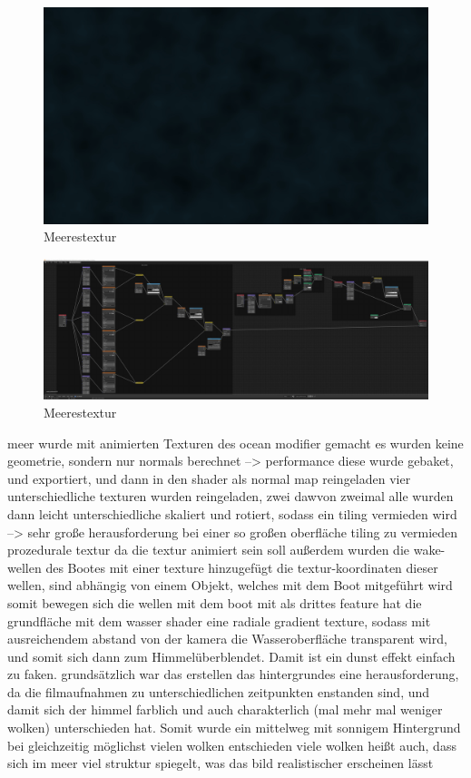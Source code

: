 \begin{figure}[H]
\includegraphics[width=\textwidth]{gfx/prod/ocean/meer7.jpg}
\caption{Meerestextur}
\label{meer7}
\end{figure}

\begin{figure}[H]
\includegraphics[width=\textwidth]{gfx/prod/env/ocean_shader.jpg}
\caption{Meerestextur}
\label{ocean_shader}
\end{figure}


meer wurde mit animierten Texturen des ocean modifier gemacht
es wurden keine geometrie, sondern nur normals berechnet --> performance
diese wurde gebaket, und exportiert, und dann in den shader als normal map reingeladen
vier unterschiedliche texturen wurden reingeladen, zwei dawvon zweimal
alle wurden dann leicht unterschiedliche skaliert und rotiert, sodass ein tiling vermieden wird
--> sehr große herausforderung bei einer so großen oberfläche tiling zu vermieden
prozedurale textur da die textur animiert sein soll
außerdem wurden die wake-wellen des Bootes mit einer texture hinzugefügt
die textur-koordinaten dieser wellen, sind abhängig von einem Objekt, welches mit dem Boot mitgeführt wird
somit bewegen sich die wellen mit dem boot mit
als drittes feature hat die grundfläche mit dem wasser shader eine radiale gradient texture, sodass mit ausreichendem abstand von der kamera die Wasseroberfläche transparent wird, und somit sich dann zum Himmelüberblendet. Damit ist ein dunst effekt einfach zu faken.
grundsätzlich war das erstellen das hintergrundes eine herausforderung, da die filmaufnahmen zu unterschiedlichen zeitpunkten enstanden sind, und damit sich der himmel farblich und auch charakterlich (mal mehr mal weniger wolken) unterschieden hat. Somit wurde ein mittelweg mit sonnigem Hintergrund bei gleichzeitig möglichst vielen wolken entschieden
viele wolken heißt auch, dass sich im meer viel struktur spiegelt, was das bild realistischer erscheinen lässt

